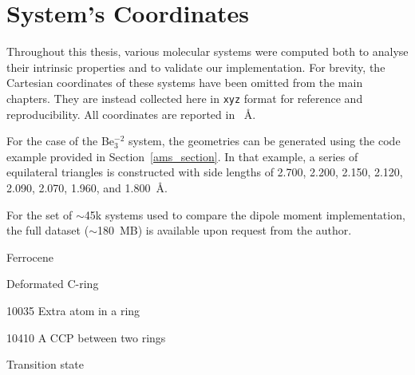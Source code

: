 \newpage
\section{System's Coordinates}\label{xyzfiles}

Throughout this thesis, various molecular systems were computed both to
analyse their intrinsic properties and to validate our implementation.
For brevity, the Cartesian coordinates of these systems have been omitted
from the main chapters. They are instead collected here in \texttt{xyz}
format for reference and reproducibility. All coordinates are reported in
\SI{}{\angstrom}.

For the case of the Be$_3^{-2}$ system, the geometries can be generated
using the code example provided in Section~\ref{ams_section}. In that
example, a series of equilateral triangles is constructed with side lengths
of 2.700, 2.200, 2.150, 2.120, 2.090, 2.070, 1.960, and 1.800~\AA.

For the set of $\sim$45k systems used to compare the dipole moment
implementation, the full dataset ($\sim$180~MB) is available upon request from
the author.

\vspace*{1cm}%
{\renewcommand{\baselinestretch}{.5}
\scriptsize{

\noindent {} Ferrocene

\noindent {} Deformated C-ring

\newpage
\noindent {}10035 Extra atom in a ring

\noindent {}10410 A CCP between two rings

\noindent {} Transition state

}}
    
      
